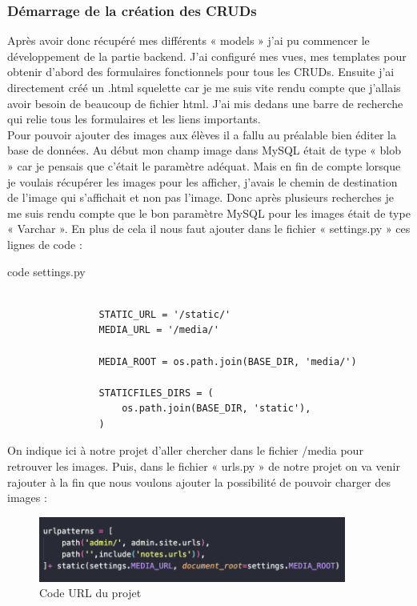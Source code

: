 \documentclass[12pt, a4paper]{article}
\begin{document}
            \subsubsection{Démarrage de la création des CRUDs}
            Après avoir donc récupéré mes différents « models » j’ai pu commencer le développement de la partie backend. J’ai configuré mes vues, mes templates pour obtenir d’abord des formulaires fonctionnels pour tous les CRUDs. Ensuite j’ai directement créé un .html squelette car je me suis vite rendu compte que j’allais avoir besoin de beaucoup de fichier html. J’ai mis dedans une barre de recherche qui relie tous les formulaires et les liens importants. 
            \\[0.5cm]Pour pouvoir ajouter des images aux élèves il a fallu au préalable bien éditer la base de données. Au début mon champ image dans MySQL était de type « blob » car je pensais que c’était le paramètre adéquat. Mais en fin de compte lorsque je voulais récupérer les images pour les afficher, j’avais le chemin de destination de l’image qui s’affichait et non pas l’image. Donc après plusieurs recherches je me suis rendu compte que le bon paramètre MySQL pour les images était de type « Varchar ». 
            En plus de cela il nous faut ajouter dans le fichier « settings.py » ces lignes de code :
            \begin{listing}[h]
                \caption{code settings.py}
                \label{lst:static}
                \begin{verbatim}

                STATIC_URL = '/static/'
                MEDIA_URL = '/media/'

                MEDIA_ROOT = os.path.join(BASE_DIR, 'media/')

                STATICFILES_DIRS = (
                    os.path.join(BASE_DIR, 'static'),
                )
                \end{verbatim}
            \end{listing}
            \newpage
            On indique ici à notre projet d’aller chercher dans le fichier /media pour retrouver les images. 
            Puis, dans le fichier « urls.py » de notre projet on va venir rajouter à la fin que nous voulons ajouter la possibilité de pouvoir charger des images :
            \begin{figure}[h]
                \centering
                \includegraphics[width=0.9\textwidth]{url.png}
                \caption{Code URL du projet}
                \label{fig:url}
            \end{figure}
\end{document}
